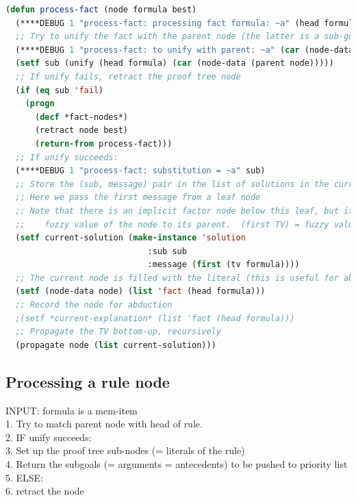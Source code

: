 \begin{lstlisting}[language=Lisp]
(defun process-fact (node formula best)
  (****DEBUG 1 "process-fact: processing fact formula: ~a" (head formula))
  ;; Try to unify the fact with the parent node (the latter is a sub-goal):
  (****DEBUG 1 "process-fact: to unify with parent: ~a" (car (node-data (parent node))))
  (setf sub (unify (head formula) (car (node-data (parent node)))))
  ;; If unify fails, retract the proof tree node
  (if (eq sub 'fail)
    (progn
      (decf *fact-nodes*)
      (retract node best)
      (return-from process-fact)))
  ;; If unify succeeds:
  (****DEBUG 1 "process-fact: substitution = ~a" sub)
  ;; Store the (sub, message) pair in the list of solutions in the current node
  ;; Here we pass the first message from a leaf node
  ;; Note that there is an implicit factor node below this leaf, but it simply passes the
  ;;    fuzzy value of the node to its parent.  (first TV) = fuzzy value
  (setf current-solution (make-instance 'solution
                             :sub sub
                             :message (first (tv formula))))
  ;; The current node is filled with the literal (this is useful for abduction; see below)
  (setf (node-data node) (list 'fact (head formula)))
  ;; Record the node for abduction
  ;(setf *current-explanation* (list 'fact (head formula)))
  ;; Propagate the TV bottom-up, recursively
  (propagate node (list current-solution)))
\end{lstlisting}

\subsection{Processing a rule node}

INPUT:  formula is a mem-item\\
1. Try to match parent node with head of rule.\\
2. IF unify succeeds:\\
3.     Set up the proof tree sub-nodes (= literals of the rule)\\
4.     Return the subgoals (= arguments = antecedents) to be pushed to priority list\\
5. ELSE:\\
6.     retract the node

